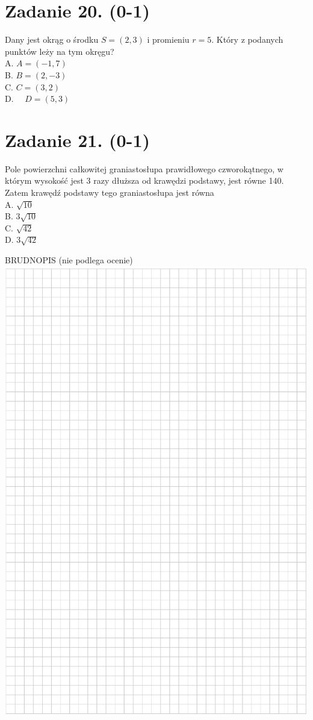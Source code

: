 \documentclass[10pt]{article}
\begin{document}
\section*{Zadanie 20. (0-1)}
Dany jest okrąg o środku \(S=(2,3)\) i promieniu \(r=5\). Który z podanych punktów leży na tym okręgu?\\
A. \(A=(-1,7)\)\\
B. \(B=(2,-3)\)\\
C. \(C=(3,2)\)\\
D. \(\quad D=(5,3)\)

\section*{Zadanie 21. (0-1)}
Pole powierzchni całkowitej graniastosłupa prawidłowego czworokątnego, w którym wysokość jest 3 razy dłuższa od krawędzi podstawy, jest równe 140. Zatem krawędź podstawy tego graniastosłupa jest równa\\
A. \(\sqrt{10}\)\\
B. \(3 \sqrt{10}\)\\
C. \(\sqrt{42}\)\\
D. \(3 \sqrt{42}\)

BRUDNOPIS (nie podlega ocenie)\\
\includegraphics[max width=\textwidth, center]{2024_11_21_7b5527312ea89ae66fd0g-13}
\end{document}
